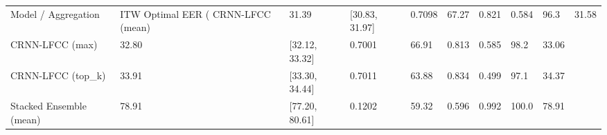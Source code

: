 \begin{tabular}{lllllllll}
\toprule
Model / Aggregation & ITW Optimal EER (%
\midrule
CRNN-LFCC (mean) & 31.39 & [30.83, 31.97] & 0.7098 & 67.27 & 0.821 & 0.584 & 96.3 & 31.58 \\
CRNN-LFCC (max) & 32.80 & [32.12, 33.32] & 0.7001 & 66.91 & 0.813 & 0.585 & 98.2 & 33.06 \\
CRNN-LFCC (top_k) & 33.91 & [33.30, 34.44] & 0.7011 & 63.88 & 0.834 & 0.499 & 97.1 & 34.37 \\
Stacked Ensemble (mean) & 78.91 & [77.20, 80.61] & 0.1202 & 59.32 & 0.596 & 0.992 & 100.0 & 78.91 \\
\bottomrule
\end{tabular}
